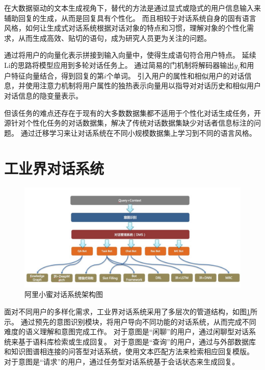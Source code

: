 \documentclass{clv3}
\begin{document}
在大数据驱动的文本生成视角下，替代的方法是通过显式或隐式的用户信息输入来辅助回复的生成，从而是回复具有个性化。
而且相较于对话系统自身的固有语言风格，如何让生成式对话系统根据对话对象的特点和习惯，理解对象的个性化需求，从而生成高效、贴切的语句，成为研究人员更为关注的问题\cite{luo2019learning}。

\cite{li2016a}通过将用户的向量化表示拼接到输入向量中，使得生成语句符合用户特点。
\cite{kottur2017exploring}延续Li的思路将模型应用到多轮对话任务上。
\cite{zheng2019personalized}通过简易的门机制将解码器输出$y_i$和用户特征向量结合，得到回复的第$i$个单词。
\cite{luo2019learning}引入用户的属性和相似用户的对话信息，并使用注意力机制将用户属性的独热表示向量用以指导对对话历史和相似用户对话信息的隐变量表示。

但该任务的难点还存在于现有的大多数数据集都不适用于个性化对话生成任务，\cite{zheng2019personalized, joshi2017personalization, zhang2018personalizing}开源针对个性化任务的对话数据集，解决了传统对话数据集缺少对话者信息标注的问题。
\cite{zhang2019neural}通过迁移学习来让对话系统在不同小规模数据集上学习到不同的语言风格。

\section{工业界对话系统}
\begin{figure}[h] %
    \centering %
    \includegraphics[width=1\textwidth]{industry_model} %
    \caption{阿里小蜜对话系统架构图} %
    \label{industry_model} %
\end{figure}%

面对不同用户的多样化需求，工业界对话系统采用了多层次的管道结构\cite{li2019alime, zhou2018design}，如图\ref{industry_model}所示。
通过预先的意图识别模块，将用户导向不同功能的对话系统，从而完成不同难度的语义理解和意图完成工作。
对于意图是“闲聊”的用户，通过闲聊型对话系统来基于语料库检索或生成回复\cite{zhou2018design}。
对于意图是“查询”的用户，通过与外部数据库和知识图谱相连接的问答型对话系统，使用文本匹配方法来检索相应回复模版\cite{li2019alime}。
对于意图是“请求”的用户，通过任务型对话系统基于会话状态来生成回复。
\end{document}
